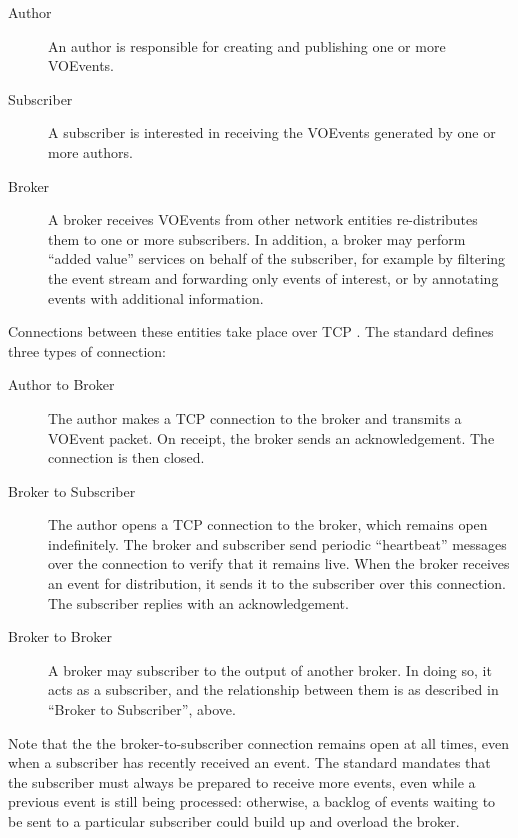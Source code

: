 \documentclass[5p,authoryear]{elsarticle}
\begin{document}
\begin{description}

  \item[Author]{An author is responsible for creating and publishing one or
  more VOEvents.}

  \item[Subscriber]{A subscriber is interested in receiving the VOEvents
  generated by one or more authors.}

  \item[Broker]{A broker receives VOEvents from other network entities
  re-distributes them to one or more subscribers. In addition, a broker may
  perform ``added value'' services on behalf of the subscriber, for example by
  filtering the event stream and forwarding only events of interest, or by
  annotating events with additional information.}

\end{description}

Connections between these entities take place over TCP \citep{Cerf:1974}. The
standard defines three types of connection:

\begin{description}

  \item[Author to Broker]{The author makes a TCP connection to the broker and
  transmits a VOEvent packet. On receipt, the broker sends an acknowledgement.
  The connection is then closed.}

  \item[Broker to Subscriber]{The author opens a TCP connection to the broker,
  which remains open indefinitely. The broker and subscriber send periodic
  ``heartbeat'' messages over the connection to verify that it remains live.
  When the broker receives an event for distribution, it sends it to the
  subscriber over this connection. The subscriber replies with an
  acknowledgement.}

  \item[Broker to Broker]{A broker may subscriber to the output of another
  broker. In doing so, it acts as a subscriber, and the relationship between
  them is as described in ``Broker to Subscriber'', above.}

\end{description}

Note that the the broker-to-subscriber connection remains open at all times,
even when a subscriber has recently received an event. The standard mandates
that the subscriber must always be prepared to receive more events, even while
a previous event is still being processed: otherwise, a backlog of events
waiting to be sent to a particular subscriber could build up and overload the
broker.
\end{document}
